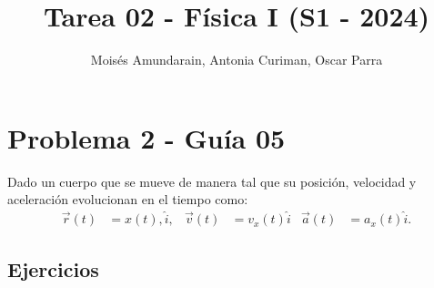 \documentclass[12pt,tikz,border=3.14mm]{article}
\begin{document}
\title{Tarea 02 - Física I (S1 - 2024)}
\author{Moisés Amundarain, Antonia Curiman, Oscar Parra}
\maketitle
\newpage
\tableofcontents
\newpage 
\section{Problema 2 - Guía 05}
	Dado un cuerpo que se mueve de manera tal que su posición, velocidad y aceleración evolucionan en el tiempo como:
		\begin{align*}
			\vec{r}(t) &= x(t), \hat{i}, 	&	 \vec{v}(t) &=v_{x}(t)\hat{i} & \vec{a}(t) &= a_{x}(t) \hat{i}. 
		\end{align*}
	\subsection*{Ejercicios}
\end{document}
